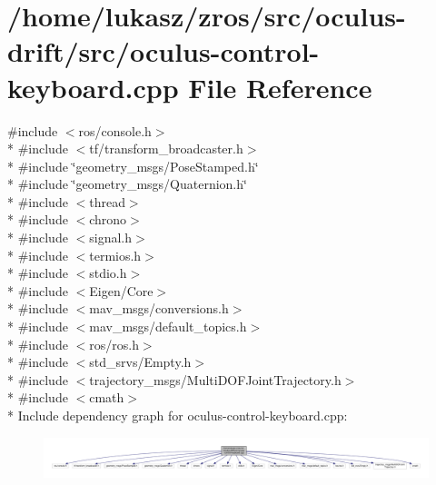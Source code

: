 \hypertarget{oculus-control-keyboard_8cpp}{}\section{/home/lukasz/zros/src/oculus-\/drift/src/oculus-\/control-\/keyboard.cpp File Reference}
\label{oculus-control-keyboard_8cpp}
{\ttfamily \#include $<$ros/console.\+h$>$}\\*
{\ttfamily \#include $<$tf/transform\+\_\+broadcaster.\+h$>$}\\*
{\ttfamily \#include \char`\"{}geometry\+\_\+msgs/\+Pose\+Stamped.\+h\char`\"{}}\\*
{\ttfamily \#include \char`\"{}geometry\+\_\+msgs/\+Quaternion.\+h\char`\"{}}\\*
{\ttfamily \#include $<$thread$>$}\\*
{\ttfamily \#include $<$chrono$>$}\\*
{\ttfamily \#include $<$signal.\+h$>$}\\*
{\ttfamily \#include $<$termios.\+h$>$}\\*
{\ttfamily \#include $<$stdio.\+h$>$}\\*
{\ttfamily \#include $<$Eigen/\+Core$>$}\\*
{\ttfamily \#include $<$mav\+\_\+msgs/conversions.\+h$>$}\\*
{\ttfamily \#include $<$mav\+\_\+msgs/default\+\_\+topics.\+h$>$}\\*
{\ttfamily \#include $<$ros/ros.\+h$>$}\\*
{\ttfamily \#include $<$std\+\_\+srvs/\+Empty.\+h$>$}\\*
{\ttfamily \#include $<$trajectory\+\_\+msgs/\+Multi\+D\+O\+F\+Joint\+Trajectory.\+h$>$}\\*
{\ttfamily \#include $<$cmath$>$}\\*
Include dependency graph for oculus-\/control-\/keyboard.cpp\+:\nopagebreak
\begin{figure}[H]
\begin{center}
\leavevmode
\includegraphics[width=350pt]{oculus-control-keyboard_8cpp__incl}
\end{center}
\end{figure}
